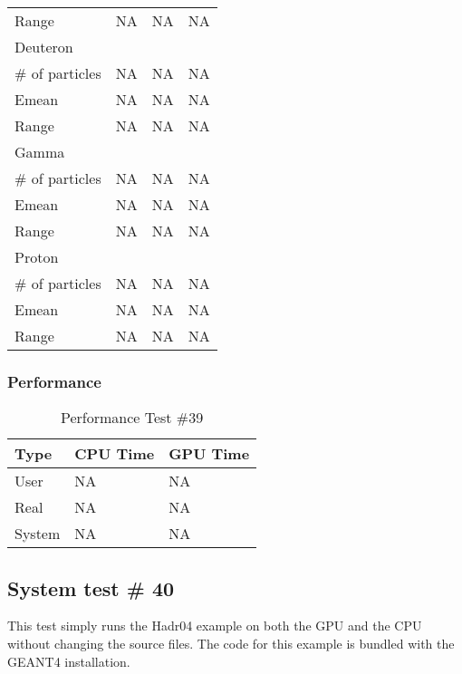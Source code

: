 \documentclass[12pt]{article}
\begin{document}
\begin{table}[!htbp]
\begin{tabular}{llll}
		Range&NA&NA&NA\\
		Deuteron&&&\\
		\# of particles&NA&NA&NA\\
		Emean&NA&NA&NA\\
		Range&NA&NA&NA\\
		Gamma&&&\\
		\# of particles&NA&NA&NA\\
		Emean&NA&NA&NA\\
		Range&NA&NA&NA\\
		Proton&&&\\
		\# of particles&NA&NA&NA\\
		Emean&NA&NA&NA\\
		Range&NA&NA&NA\\
		\end{tabular}
		\end{table}
		\break
	\subsubsection{Performance}
		\begin{table}[!htbp]
		\centering
		\caption{Performance Test \#39}\label{_acc}
		\begin{tabular}{lll}
		\toprule
		Type&CPU Time& GPU Time\\\midrule
		User&NA&NA\\
		Real&NA&NA\\
		System&NA&NA\\
		\end{tabular}
		\end{table}
\break
\subsection{System test \# 40}
This test simply runs the Hadr04 example on both the GPU and the CPU without changing the source files. The code for this example is bundled with the GEANT4 installation.\\
\end{document}
